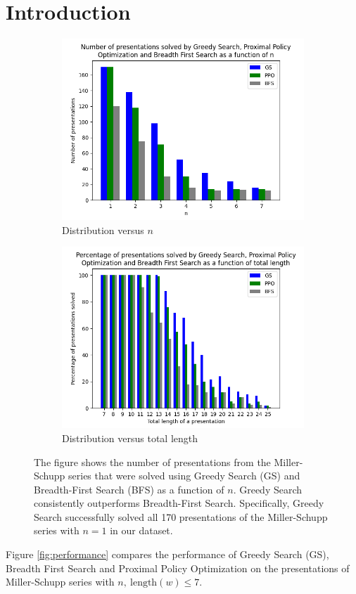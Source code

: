 
\section{Introduction\label{sec:intro}}


\begin{figure}
	\centering
	\begin{subfigure}[b]{0.5\textwidth}
		\includegraphics[width=1.1\textwidth]{fig/performance_vs_n.png}
		\caption{Distribution versus $n$}
		\label{fig:performance_vs_n}
	\end{subfigure}
	
	\begin{subfigure}[b]{0.5\textwidth}
		\centering
		\includegraphics[width=1.1\textwidth]{fig/performance_vs_length.png}
		\caption{Distribution versus total length}
		\label{fig:performance_vs_length}
	\end{subfigure}
	\caption{The figure shows the number of presentations from the Miller-Schupp series that were solved using Greedy Search (GS) and Breadth-First Search (BFS) as a function of \( n \). Greedy Search consistently outperforms Breadth-First Search. Specifically, Greedy Search successfully solved all 170 presentations of the Miller-Schupp series with \( n=1 \) in our dataset.} \label{fig:performance}
	
\end{figure}

Figure \autoref{fig:performance} compares the performance of Greedy Search (GS), Breadth First Search and Proximal Policy Optimization on the presentations of Miller-Schupp series with $n, \ \text{length}(w) \leq 7$.
